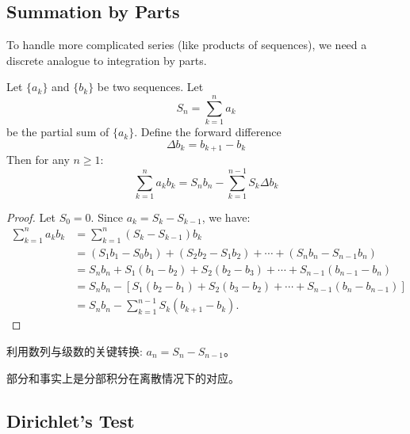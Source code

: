 \documentclass[
	UTF-8,
	11pt, %
	a4paper, %
]{LegrandOrangeBook}
\begin{document}
    \newpage


    \subsection{Summation by Parts}

    To handle more complicated series (like products of sequences), we need a discrete analogue to integration by parts.

    \begin{lemma}
    Let $\{a_k\}$ and $\{b_k\}$ be two sequences. Let 
    $$S_n = \sum_{k=1}^n a_k$$ 
    be the partial sum of $\{a_k\}$. 
    Define the forward difference $$\Delta b_k = b_{k+1} - b_k$$ 
    Then for any $n \ge 1$:
    \[ \sum_{k=1}^n a_k b_k = S_n b_n - \sum_{k=1}^{n-1} S_k \Delta b_k \]
    \end{lemma}

    \begin{proof}
    Let $S_0 = 0$. Since $a_k = S_k - S_{k-1}$, we have:
    \[
    \begin{aligned}
    \sum_{k=1}^n a_k b_k &= \sum_{k=1}^n (S_k - S_{k-1}) b_k \\
    &= (S_1 b_1 - S_0 b_1) + (S_2 b_2 - S_1 b_2) + \cdots + (S_n b_n - S_{n-1} b_n) \\
    &= S_n b_n + S_1(b_1 - b_2) + S_2(b_2 - b_3) + \cdots + S_{n-1}(b_{n-1} - b_n) \\
    &= S_n b_n - \left[ S_1(b_2 - b_1) + S_2(b_3 - b_2) + \cdots + S_{n-1}(b_n - b_{n-1}) \right] \\
    &= S_n b_n - \sum_{k=1}^{n-1} S_k (b_{k+1} - b_k).
    \end{aligned}
    \]
    \end{proof}

    \begin{remark}
        利用数列与级数的关键转换: $a_n = S_n - S_{n-1}$。
    \end{remark}

    \begin{remark}
        部分和事实上是分部积分在离散情况下的对应。
    \end{remark}

    \newpage

    \subsection{Dirichlet's Test}
\end{document}
